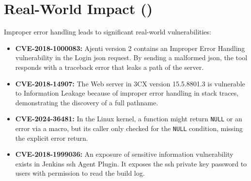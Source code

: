\section{Real-World Impact ()}
Improper error handling leads to significant real-world vulnerabilities:
\begin{itemize}
    \item \textbf{CVE-2018-1000083:} Ajenti version 2 contains an Improper Error Handling vulnerability in the Login \gls{json} request. By sending a malformed \gls{json}, the tool responds with a traceback error that leaks a path of the server.
    \item \textbf{CVE-2018-14907:} The Web server in 3CX version 15.5.8801.3 is vulnerable to Information Leakage because of improper error handling in stack traces, demonstrating the discovery of a full pathname.
    \item \textbf{CVE-2024-36481:} In the Linux kernel, a function might return \texttt{NULL} or an error via a macro, but its caller only checked for the \texttt{NULL} condition, missing the explicit error return.
    \item \textbf{CVE-2018-1999036:} An exposure of sensitive information vulnerability exists in Jenkins \gls{ssh} Agent Plugin. It exposes the \gls{ssh} private key password to users with permission to read the build log.
\end{itemize}
